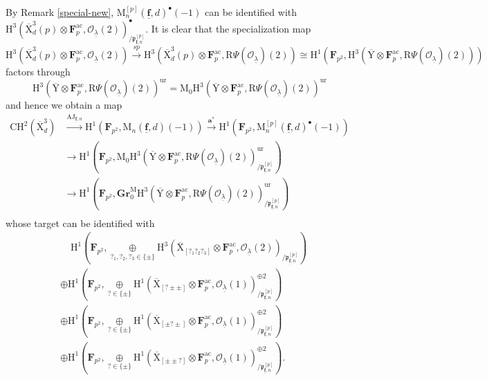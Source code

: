 \documentclass[10pt]{amsart}
\numberwithin{equation}{section}
\theoremstyle{plain}
\numberwithin{equation}{section}
\theoremstyle{definition}
\theoremstyle{remark}
\def\AJ{\mathrm{AJ}}
\def\ac{\mathrm{ac}}
\def\ur{\mathrm{ur}}
\def\ac{\mathrm{ac}}
\def\undlamb{\underline{\lambda}}
\def\triplef{\underline{\mathbf{f}}}
\def\triplepnp {{\frakp}^{[p]}_{\triplef, n}}
\def\calO{\mathcal{O}}
\def\frakp{\mathfrak{p}}
\def\FF{\mathbf{F}}
\def\rmH{\mathrm{H}}
\def\rmM{\mathrm{M}}
\def\rmX{\mathrm{X}}
\def\rmXbar{\overline{\rmX}}
\def\rmY{\mathrm{Y}}
\def\rmR{\mathrm{R}}
\newcommand{\Gr}{\mathbf{Gr}}
\begin{document}
By Remark \ref{special-new}, $\rmM^{[p]}_{n}(\triplef, d)^{\bullet}(-1)$ can be identified with $\rmH^{3}(\overline{\rmX}^{3}_{d}(p)\otimes{\FF}^{\ac}_{p}, \calO_{\undlamb}(2))^{\bullet}_{/\frakp^{[p]}_{\triplef,n}}$.
It is clear that the specialization map $\rmH^{3}(\overline{\rmX}^{3}_{d}(p)\otimes{\FF}^{\ac}_{p}, \calO_{\undlamb}(2))\xrightarrow{sp} \rmH^{3}(\overline{\rmX}^{3}_{d}(p)\otimes\FF^{\ac}_{p}, \rmR\Psi(\calO_{\undlamb})(2))\cong \rmH^{1}(\FF_{p^{2}}, \rmH^{3}(\overline{\rmY}\otimes\FF^{\ac}_{p}, \rmR\Psi(\calO_{\undlamb})(2)))$ factors through
\begin{equation*}
\rmH^{3}(\overline{\rmY}\otimes\FF^{\ac}_{p}, \rmR\Psi(\calO_{\undlamb})(2))^{\ur}=\rmM_{0}\rmH^{3}(\overline{\rmY}\otimes\FF^{\ac}_{p}, \rmR\Psi(\calO_{\undlamb})(2))^{\ur}
\end{equation*}
and hence we obtain a map 
\begin{equation*}
\begin{aligned}
\mathrm{CH}^{2}(\overline{\rmX}^{3}_{d})&\xrightarrow{{\AJ}_{\triplef, n}} \rmH^{1}(\FF_{p^{2}}, \rmM_{n}(\triplef, d)(-1))\xrightarrow{\mathbf{a}^{\ast}} \rmH^{1}(\FF_{p^{2}}, \rmM^{[p]}_{n}(\triplef, d)^{\bullet}(-1))\\
&\longrightarrow \rmH^{1}(\FF_{p^{2}}, \rmM_{0}\rmH^{3}(\overline{\rmY}\otimes\FF^{\ac}_{p}, \rmR\Psi(\calO_{\undlamb})(2))^{\ur}_{/\frakp^{[p]}_{\triplef,n}})\\
&\longrightarrow \rmH^{1}(\FF_{p^{2}}, \Gr^{\rmM}_{0}\rmH^{3}(\overline{\rmY}\otimes\FF^{\ac}_{p}, \rmR\Psi(\calO_{\undlamb})(2))^{\ur}_{/\frakp^{[p]}_{\triplef,n}})\\
\end{aligned}
\end{equation*}
whose target can be identified with 
\begin{equation*}
\begin{aligned}
&\phantom{aa}\rmH^{1}(\FF_{p^{2}}, \underset{?_{1}, ?_{2}, ?_{3}\in\{\pm\}}\oplus\rmH^{3}(\rmXbar_{[?_{1}?_{2}?_{3}]}\otimes{\FF^{\ac}_{p}}, \calO_{\undlamb}(2))_{/\triplepnp})\\
&\oplus\rmH^{1}(\FF_{p^{2}}, \underset{?\in\{\pm\}}\oplus\rmH^{1}(\rmXbar_{[?\pm\pm]}\otimes{\FF^{\ac}_{p}}, \calO_{\undlamb}(1))^{\oplus2}_{/\triplepnp})\\
&\oplus \rmH^{1}(\FF_{p^{2}}, \underset{?\in\{\pm\}}\oplus\rmH^{1}(\rmXbar_{[\pm?\pm]}\otimes{\FF^{\ac}_{p}}, \calO_{\undlamb}(1))^{\oplus2}_{/\triplepnp})\\
&\oplus \rmH^{1}(\FF_{p^{2}}, \underset{?\in\{\pm\}}\oplus\rmH^{1}(\rmXbar_{[\pm\pm?]}\otimes{\FF^{\ac}_{p}}, \calO_{\undlamb}(1))^{\oplus2}_{/\triplepnp}).\\
\end{aligned}
\end{equation*}
\end{document}
